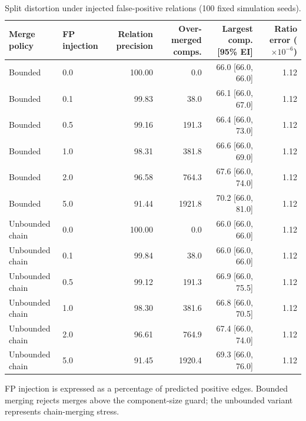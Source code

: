 \begin{table}[t]
\caption{Split distortion under injected false-positive relations (100 fixed simulation seeds).}
\label{tab:fp-robustness}
\centering
\scriptsize
\begin{tabular}{llrrrr}
\toprule
Merge policy & FP injection & Relation precision & Over-merged comps. & Largest comp. [95\% EI] & Ratio error ($\times 10^{-6}$) \\
\midrule
Bounded & 0.0 & 100.00 & 0.0 & 66.0 [66.0, 66.0] & 1.12 \\
Bounded & 0.1 & 99.83 & 38.0 & 66.1 [66.0, 67.0] & 1.12 \\
Bounded & 0.5 & 99.16 & 191.3 & 66.4 [66.0, 73.0] & 1.12 \\
Bounded & 1.0 & 98.31 & 381.8 & 66.6 [66.0, 69.0] & 1.12 \\
Bounded & 2.0 & 96.58 & 764.3 & 67.6 [66.0, 74.0] & 1.12 \\
Bounded & 5.0 & 91.44 & 1921.8 & 70.2 [66.0, 81.0] & 1.12 \\
Unbounded chain & 0.0 & 100.00 & 0.0 & 66.0 [66.0, 66.0] & 1.12 \\
Unbounded chain & 0.1 & 99.84 & 38.0 & 66.0 [66.0, 66.0] & 1.12 \\
Unbounded chain & 0.5 & 99.12 & 191.3 & 66.9 [66.0, 75.5] & 1.12 \\
Unbounded chain & 1.0 & 98.30 & 381.6 & 66.8 [66.0, 70.5] & 1.12 \\
Unbounded chain & 2.0 & 96.61 & 764.9 & 67.4 [66.0, 74.0] & 1.12 \\
Unbounded chain & 5.0 & 91.45 & 1920.4 & 69.3 [66.0, 76.0] & 1.12 \\
\bottomrule
\end{tabular}
\vspace{2pt}
\begin{minipage}{\textwidth}
\footnotesize FP injection is expressed as a percentage of predicted positive edges. Bounded merging rejects merges above the component-size guard; the unbounded variant represents chain-merging stress.
\end{minipage}
\end{table}
